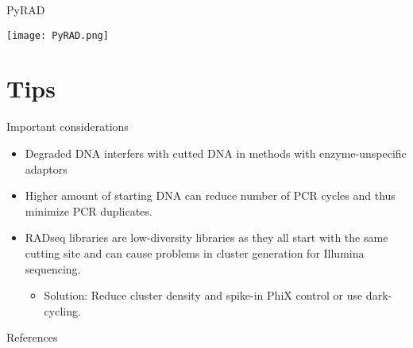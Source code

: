 \documentclass[presentation]{beamer}
\begin{document}
\begin{frame}[label={sec:orgbc81ef2}]{PyRAD}
\begin{latex}
\begin{center}
\end{latex}

\begin{center}
\texttt{[image: PyRAD.png]}
\end{center}

\begin{latex}
\end{center}
\end{latex}
\end{frame}
\section{Tips}
\label{sec:orgba5ab2f}
\begin{frame}[label={sec:org7aeb6d5}]{Important considerations}
\begin{itemize}
\item Degraded DNA interfers with cutted DNA in methods with enzyme-unspecific adaptors
\item Higher amount of starting DNA can reduce number of PCR cycles and
thus minimize PCR duplicates.
\item RADseq libraries are low-diversity libraries as they all start with
the same cutting site and can cause problems in cluster generation
for Illumina sequencing.
\begin{itemize}
\item Solution: Reduce cluster density and spike-in PhiX control or use dark-cycling.
\end{itemize}
\end{itemize}
\end{frame}
\begin{frame}[label={sec:org2cb668d}]{References}
\begin{latex}
\raggedright
\printbibliography[sorting=nty,heading=bibnumbered]
\end{latex}
\end{frame}
\end{document}
